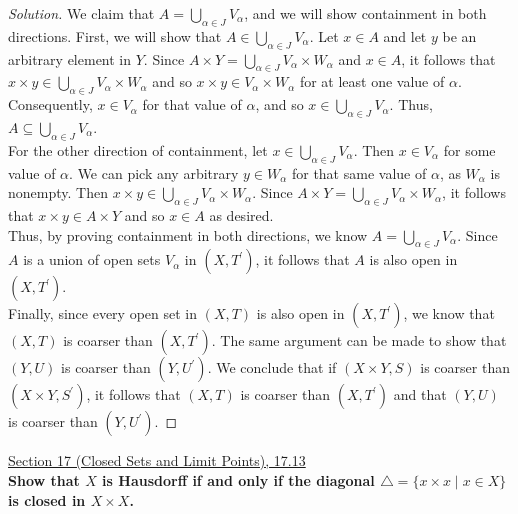 \documentclass[11pt]{article}
\newenvironment{solution}
  {\renewcommand\qedsymbol{$\blacksquare$}\begin{proof}[Solution]}
  {\end{proof}}
\begin{document}
\begin{enumerate}[a)]
\begin{solution}
	We claim that $A = \bigcup\limits_{\alpha \in J} V_\alpha$, and we will show containment in both directions. First, we will show that $A \in \bigcup\limits_{\alpha \in J} V_\alpha$. Let $x \in A$ and let $y$ be an arbitrary element in $Y$.
	Since $A \times Y = \bigcup\limits_{\alpha \in J} V_{\alpha} \times W_{\alpha}$ and $x \in A$, it follows that $x \times y \in \bigcup\limits_{\alpha \in J} V_{\alpha} \times W_{\alpha}$ and so $x \times y \in V_\alpha \times W_\alpha$ for at least one value of $\alpha$. Consequently, $x \in V_\alpha$ for that 
	value of $\alpha$, and so $x \in \bigcup\limits_{\alpha \in J} V_\alpha$. Thus, $A \subseteq \bigcup\limits_{\alpha \in J} V_\alpha$. \\

	For the other direction of containment, let $x \in \bigcup\limits_{\alpha \in J} V_\alpha$. Then $x \in V_\alpha$ for some value of $\alpha$. We can pick any arbitrary $y \in W_\alpha$ for that same value of $\alpha$, as $W_\alpha$ is nonempty. Then
	$x \times y \in \bigcup\limits_{\alpha \in J} V_{\alpha} \times W_{\alpha}$. Since $A \times Y = \bigcup\limits_{\alpha \in J} V_{\alpha} \times W_{\alpha}$, it follows that $x \times y \in A \times Y$ and so $x \in A$ as desired. \\

	Thus, by proving containment in both directions, we know $A = \bigcup\limits_{\alpha \in J} V_\alpha$. Since $A$ is a union of open sets $V_\alpha$ in $(X, T^{\prime})$, it follows that
	$A$ is also open in $(X, T^{\prime})$. \\

	Finally, since every open set in $(X, T)$ is also open in $(X, T^{\prime})$, we know that $(X, T)$ is coarser than $(X, T^{\prime})$. The same argument can be made
	to show that $(Y, U)$ is coarser than $(Y, U^{\prime})$. We conclude that if $(X \times Y, S)$ is coarser than $(X \times Y, S^{\prime})$, it follows that 
	$(X, T)$ is coarser than $(X, T^{\prime})$ and that $(Y, U)$ is coarser than $(Y, U^{\prime})$.
	\end{solution}
\end{enumerate}

\newpage

\underline{Section 17 (Closed Sets and Limit Points), 17.13} \\

\textbf{Show that $X$ is Hausdorff if and only if the diagonal $\triangle = \{ x \times x \mid x \in X \}$ is closed in $X \times X$.}
\end{document}
